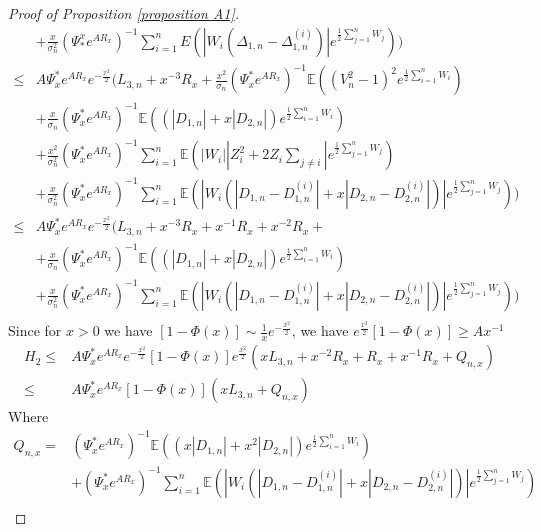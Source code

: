 \documentclass[bj,authoryear]{imsart}
\numberwithin{equation}{section}
\theoremstyle{plain}
\theoremstyle{definition}
\begin{document}
\begin{proof}[Proof of Proposition \ref{proposition A1}]
\begin{equation}
\begin{aligned}
    & +\frac{x}{\sigma_n^2}(\Psi_{*}^{x}e^{AR_x})^{-1}\sum_{i=1}^{n}E(|W_i(\Delta_{1,n}-\Delta_{1,n}^{(i)})|e^{\frac{1}{2} \sum_{j=1}^{n}W_j}))\\
    \leq&A\Psi_{x}^{*}e^{AR_x}e^{-\frac{x^2}{2}}(L_{3,n}+x^{-3}R_x+\frac{x^2}{\sigma_n}(\Psi_{x}^{*}e^{AR_x})^{-1}\mathbb{E}\left((V_n^2-1)^2e^{\frac{1}{2}\sum_{i=1}^{n}W_i}\right)\\
    &+\frac{x}{\sigma_n}(\Psi_{x}^{*}e^{AR_x})^{-1}\mathbb{E}((|D_{1,n}|+x|D_{2,n}|)e^{\frac{1}{2}\sum_{i=1}^{n}W_i})\\
    &+\frac{x^2}{\sigma_n^2}(\Psi_{x}^{*}e^{AR_x})^{-1}\sum_{i=1}^{n}\mathbb{E}(|W_i||Z_i^2+2Z_i\sum_{j\neq i}|e^{\frac{1}{2}\sum_{j=1}^{n}W_j})\\
    &+ \frac{x}{\sigma_n^2}(\Psi_{x}^{*}e^{AR_x})^{-1}\sum_{i=1}^{n}\mathbb{E}(|W_i(|D_{1,n}-D_{1,n}^{(i)}|+x|D_{2,n}-D_{2,n}^{(i)}|)|e^{\frac{1}{2}\sum_{j=1}^{n}W_j}))\\
    \leq &A\Psi_{x}^{*}e^{AR_x}e^{-\frac{x^2}{2}}(L_{3,n}+x^{-3}R_x+x^{-1}R_x+x^{-2}R_x+\\
    &+\frac{x}{\sigma_n}(\Psi_{x}^{*}e^{AR_x})^{-1}\mathbb{E}((|D_{1,n}|+x|D_{2,n}|)e^{\frac{1}{2}\sum_{i=1}^{n}W_i})\\
    &+\frac{x}{\sigma_n^2}(\Psi_{x}^{*}e^{AR_x})^{-1}\sum_{i=1}^{n}\mathbb{E}(|W_i(|D_{1,n}-D_{1,n}^{(i)}|+x|D_{2,n}-D_{2,n}^{(i)}|)|e^{\frac{1}{2}\sum_{j=1}^{n}W_j}))\\
  \end{aligned}
\end{equation}
Since for $x>0$ we have $[1-\Phi(x)]\sim\frac{1}{x}e^{-\frac{x^2}{2}}$, we have $e^{\frac{x^2}{2}}[1-\Phi(x)]\geq Ax^{-1}$
\begin{equation}
  \begin{aligned}
    H_2 \leq & A\Psi_{x}^{*}e^{AR_x}e^{-\frac{x^2}{2}}[1-\Phi(x)]e^{\frac{x^2}{2}}(xL_{3,n}+x^{-2}R_x+R_x+x^{-1}R_x+Q_{n,x})\\
    \leq & A\Psi_{x}^{*}e^{AR_x}[1-\Phi(x)](xL_{3,n}+Q_{n,x})
  \end{aligned}
\end{equation}
Where
\begin{equation}
  \begin{aligned}
    Q_{n,x} =& (\Psi_{x}^{*}e^{AR_x})^{-1}\mathbb{E}((x|D_{1,n}|+x^2|D_{2,n}|)e^{\frac{1}{2}\sum_{i=1}^{n}W_i})\\
            &+(\Psi_{x}^{*}e^{AR_x})^{-1}\sum_{i=1}^{n}\mathbb{E}(|W_i(|D_{1,n}-D_{1,n}^{(i)}|+x|D_{2,n}-D_{2,n}^{(i)}|)|e^{\frac{1}{2}\sum_{j=1}^{n}W_j})\\

\end{aligned}
\end{equation}
\end{proof}
\end{document}
